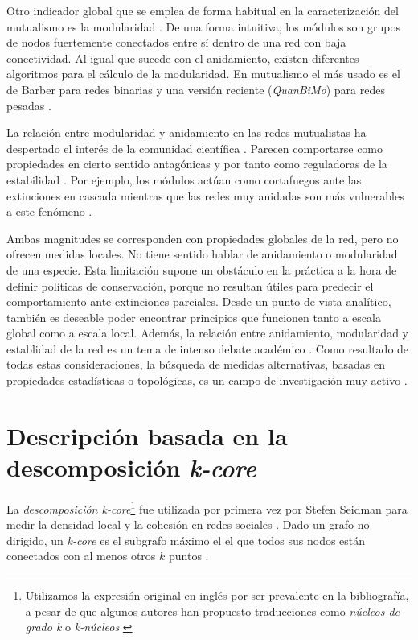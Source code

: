 Otro indicador global que se emplea de forma habitual en la caracterización del mutualismo es la modularidad \cite{newman2004finding, olesen2007modularity}. De una forma intuitiva, los módulos son grupos de nodos fuertemente conectados entre sí dentro de una red con baja conectividad.
Al igual que sucede con el anidamiento, existen diferentes algoritmos para el cálculo de la modularidad. En mutualismo el
más usado es el de Barber para redes binarias \cite{barber2007modularity} y una versión reciente (\textit{QuanBiMo}) para redes pesadas \cite{dormann2014method}.

La relación entre modularidad y anidamiento en las redes mutualistas ha despertado el interés de la comunidad científica \cite{olesen2007modularity, dupont2009ecological}. Parecen comportarse como propiedades en cierto sentido antagónicas y por tanto como reguladoras de la estabilidad \cite{fortuna2010nestedness}. Por ejemplo, los módulos actúan como cortafuegos ante las extinciones en cascada \cite{saavedra2011strong} mientras que las redes muy anidadas son más vulnerables a este fenómeno \cite{lever2014sudden}. 

Ambas magnitudes se corresponden con propiedades globales de la red, pero no ofrecen medidas locales. No tiene sentido hablar de anidamiento o modularidad de una especie. Esta limitación supone un obstáculo en la práctica a la hora de definir políticas de conservación, porque no resultan útiles para predecir el comportamiento ante extinciones parciales. Desde un punto de vista analítico, también es deseable poder encontrar principios que funcionen tanto a escala global como a escala local. 
Además, la relación entre anidamiento, modularidad y establidad de la red es un tema de intenso debate académico \cite{fortuna2010nestedness, james2012disentangling, staniczenko2013ghost, feng2014heterogeneity}. Como resultado de todas estas consideraciones, la búsqueda de medidas alternativas, basadas en propiedades estadísticas o topológicas, es un campo de investigación muy activo \cite{podani2014new,chagnon2015characterizing,strona2015new}.

\section{Descripción basada en la descomposición \textit{k-core}}

La \textit{descomposición k-core}\footnote{Utilizamos la expresión original en inglés por ser prevalente en la bibliografía, a pesar de que algunos autores han propuesto traducciones como \textit{núcleos de grado k} \cite{herrero2000terminologia} o \textit{k-núcleos} \cite{cardona2006taxonomia, martinez2011aplicacion}} fue utilizada por primera vez por Stefen Seidman para medir la densidad local y la cohesión en redes sociales \cite{seidman1983network}. Dado un grafo no dirigido, un \textit{k-core} es el subgrafo máximo el el que todos sus nodos están conectados con al menos otros $k$ puntos \cite{dorogovtsev2006k}.

